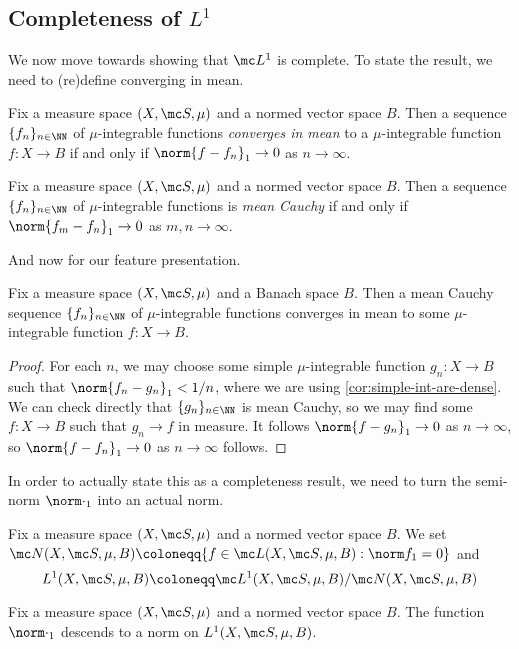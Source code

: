 \documentclass[../notes.tex]{subfiles}
\begin{document}
\subsection{Completeness of \texorpdfstring{$L^1$}{ L1}}
We now move towards showing that $\mc L^1$ is complete. To state the result, we need to (re)define converging in mean.
\begin{definition}
	Fix a measure space $(X,\mc S,\mu)$ and a normed vector space $B$. Then a sequence $\{f_n\}_{n\in\NN}$ of $\mu$-integrable functions \textit{converges in mean} to a $\mu$-integrable function $f\colon X\to B$ if and only if $\norm{f-f_n}_1\to0$ as $n\to\infty$.
\end{definition}
\begin{definition}
	Fix a measure space $(X,\mc S,\mu)$ and a normed vector space $B$. Then a sequence $\{f_n\}_{n\in\NN}$ of $\mu$-integrable functions is \textit{mean Cauchy} if and only if $\norm{f_m-f_n}_1\to0$ as $m,n\to\infty$.
\end{definition}
And now for our feature presentation.
\begin{proposition} \label{prop:l1-complete}
	Fix a measure space $(X,\mc S,\mu)$ and a Banach space $B$. Then a mean Cauchy sequence $\{f_n\}_{n\in\NN}$ of $\mu$-integrable functions converges in mean to some $\mu$-integrable function $f\colon X\to B$.
\end{proposition}
\begin{proof}
	For each $n$, we may choose some simple $\mu$-integrable function $g_n\colon X\to B$ such that $\norm{f_n-g_n}_1<1/n$, where we are using \autoref{cor:simple-int-are-dense}. We can check directly that $\{g_n\}_{n\in\NN}$ is mean Cauchy, so we may find some $f\colon X\to B$ such that $g_n\to f$ in measure. It follows $\norm{f-g_n}_1\to0$ as $n\to\infty$, so $\norm{f-f_n}_1\to0$ as $n\to\infty$ follows.
\end{proof}
In order to actually state this as a completeness result, we need to turn the semi-norm $\norm\cdot_1$ into an actual norm.
\begin{notation}
	Fix a measure space $(X,\mc S,\mu)$ and a normed vector space $B$. We set $\mc N(X,\mc S,\mu,B)\coloneqq\{f\in\mc L(X,\mc S,\mu,B):\norm f_1=0\}$ and
	\[L^1(X,\mc S,\mu,B)\coloneqq\mc L^1(X,\mc S,\mu,B)/\mc N(X,\mc S,\mu,B)\]
\end{notation}
\begin{lemma}
	Fix a measure space $(X,\mc S,\mu)$ and a normed vector space $B$. The function $\norm\cdot_1$ descends to a norm on $L^1(X,\mc S,\mu,B)$.
\end{lemma}
\end{document}

